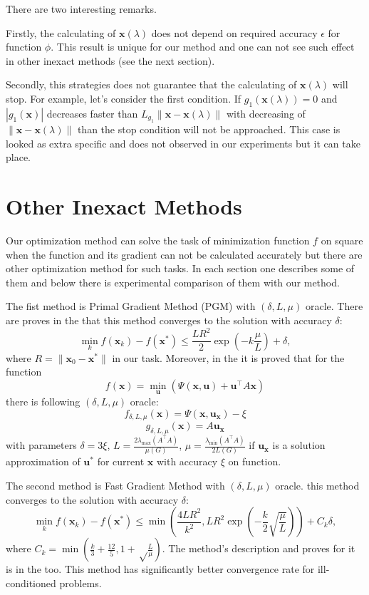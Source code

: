 \documentclass[12pt]{article}
\begin{document}
There are two interesting remarks.

Firstly, the calculating of $\textbf{x}(\lambda)$ does not depend on required accuracy $\epsilon$ for function $\phi$. This result is unique for our method and one can not see such effect in other inexact methods (see the next section).

Secondly, this strategies does not guarantee that the calculating of $\textbf{x}(\lambda)$ will stop. For example, let's consider the first condition. If $g_1(\textbf{x}(\lambda)) = 0$  and $|g_1(\textbf{x})|$ decreases faster than $L_{g_1}\|\textbf{x}-\textbf{x}(\lambda)\|$ with decreasing of $\|\textbf{x}-\textbf{x}(\lambda)\|$ than the stop condition will not be approached. This case is looked as extra specific and does not observed in our experiments but it can take place.

\section{Other Inexact Methods}
\label{Inexact}

Our optimization method can solve the task of minimization function $f$ on square when the function and its gradient can not be calculated accurately but there are other optimization method for such tasks. In each section one describes some of them and below there is experimental comparison of them with our method.

The fist method is Primal Gradient Method (PGM) with $(\delta, L,\mu)$ oracle. There are proves in the \cite{PGM} that this method converges to the solution with accuracy $\delta$:
$$\min_k f(\textbf{x}_k) - f(\textbf{x}^*) \leq \frac{LR^2}{2}\exp\left(-k\frac{\mu}{L}\right) + \delta,$$
where $R = \|\textbf{x}_0-\textbf{x}^*\|$ in our task. Moreover, in the \cite{PGM} it is proved that for the function
$$f(\textbf{x}) = \min\limits_\textbf{u} \left(\Psi(\textbf{x},\textbf{u}) + \textbf{u}^\top A\textbf{x}\right)$$
there is following $(\delta, L,\mu)$ oracle:
$$f_{\delta, L,\mu}(\textbf{x}) = \Psi(\textbf{x}, \textbf{u}_\textbf{x}) - \xi$$
$$g_{\delta, L,\mu}(\textbf{x}) = A\textbf{u}_\textbf{x}$$
with parameters $\delta = 3\xi$, $L = \frac{2\lambda_{\max}(A^\top A)}{\mu(G)}$, $\mu = \frac{\lambda_{\min}(A^\top A)}{2L(G)}$ if $\textbf{u}_\textbf{x}$ is a solution approximation of $\textbf{u}^*$ for current $\textbf{x}$ with accuracy $\xi$ on function.

The second method is Fast Gradient Method with $(\delta, L,\mu)$ oracle.
this method converges to the solution with accuracy $\delta$:
$$\min_k f(\textbf{x}_k) - f(\textbf{x}^*) \leq \min\left(\frac{4LR^2}{k^2}, LR^2\exp\left(-\frac{k}{2}\sqrt{\frac{\mu}{L}}\right)\right) + C_k\delta,$$
where $C_k = \min\left(\frac{k}{3}+\frac{12}{5}, 1+\sqrt\frac{L}{\mu}\right)$. The method's description and proves for it is in the \cite{PGM} too. This method has significantly better convergence rate for  ill-conditioned problems.
\end{document}
